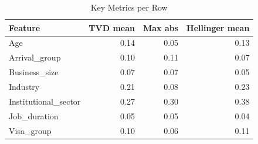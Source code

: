 \usepackage{booktabs}
\usepackage{caption}

\begin{table}[htbp]
\centering
\caption{Key Metrics per Row}
\label{tab:key_metrics_per_row}
\begin{tabular}{lrrr}
\toprule
Feature & TVD mean & Max abs & Hellinger mean \\
\midrule
Age & 0.14 & 0.05 & 0.13 \\
Arrival\_group & 0.10 & 0.11 & 0.07 \\
Business\_size & 0.07 & 0.07 & 0.05 \\
Industry & 0.21 & 0.08 & 0.23 \\
Institutional\_sector & 0.27 & 0.30 & 0.38 \\
Job\_duration & 0.05 & 0.05 & 0.04 \\
Visa\_group & 0.10 & 0.06 & 0.11 \\
\bottomrule
\end{tabular}
\end{table}
